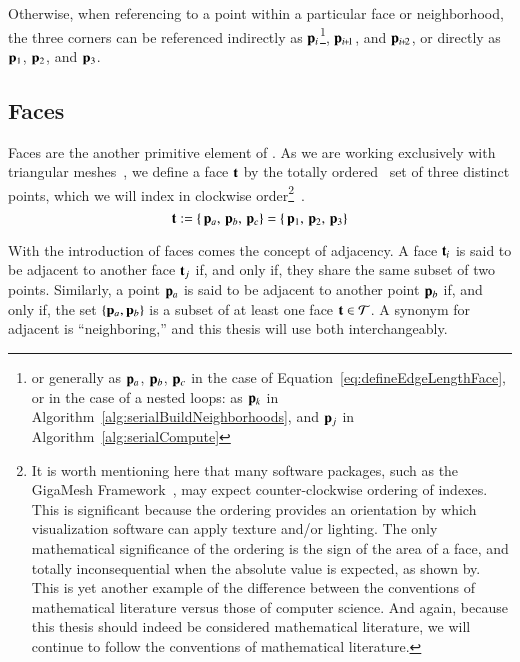 Otherwise, when referencing to a point within a particular face or neighborhood, the three corners can be referenced indirectly as $\mathbf{p}_i$\footnote{or generally as $\mathbf{p}_a$, $\mathbf{p}_b$, $\mathbf{p}_c$ in the case of Equation~\ref{eq:defineEdgeLengthFace}, or in the case of a nested loops: as $\mathbf{p}_k$ in Algorithm~\ref{alg:serialBuildNeighborhoods}, and $\mathbf{p}_j$ in Algorithm~\ref{alg:serialCompute}}, $\bp_{\sipo}$, and $\bp_{\sipt}$, or directly as $\mathbf{p}_1$, $\mathbf{p}_2$, and $\mathbf{p}_3$.~\cite[p.~25]{Mara12}%
%
%

%
%
%
\subsection{Faces}
\label{ch2s3ssF}
Faces are the another primitive element of \tdd{}. As we are working exclusively with triangular meshes~\cite[p.~26]{Mara12}, we define a face $\mathbf{t}$ by the totally ordered~\cite{Weisstein19a} set of three distinct points, which we will index in clockwise order\footnote{It is worth mentioning here that many software packages, such as the GigaMesh Framework~\cite[p.~89]{Mara12}, may expect counter-clockwise ordering of indexes.  This is significant because the ordering provides an orientation by which visualization software can apply texture and/or lighting. The only mathematical significance of the ordering is the sign of the area of a face, and totally inconsequential when the absolute value is expected, as shown by\cite[p.~2]{Braden86}. This is yet another example of the difference between the conventions of mathematical literature versus those of computer science. And again, because this thesis should indeed be considered mathematical literature, we will continue to follow the conventions of mathematical literature.}~\cite[p.~4]{Mara17}.
%
\begin{equation}
	\mathbf{t} := \left \{\,\mathbf{p}_a,\,\mathbf{p}_b,\,\mathbf{p}_c\right \} = \left \{\,\mathbf{p}_1,\,\mathbf{p}_2,\,\mathbf{p}_3\right \}
	\label{eq:defineSetOfFaces}
\end{equation}

With the introduction of faces comes the concept of adjacency. A face $\mathbf{t}_i$ is said to be adjacent to another face $\mathbf{t}_j$ if, and only if, they share the same subset of two points. Similarly, a point $\mathbf{p}_a$ is said to be adjacent to another point $\mathbf{p}_b$ if, and only if, the set $\{\mathbf{p}_a, \mathbf{p}_b\}$ is a subset of at least one face $\mathbf{t} \in \mathcal{T}$. A synonym for adjacent is ``neighboring,'' and this thesis will use both interchangeably. 

